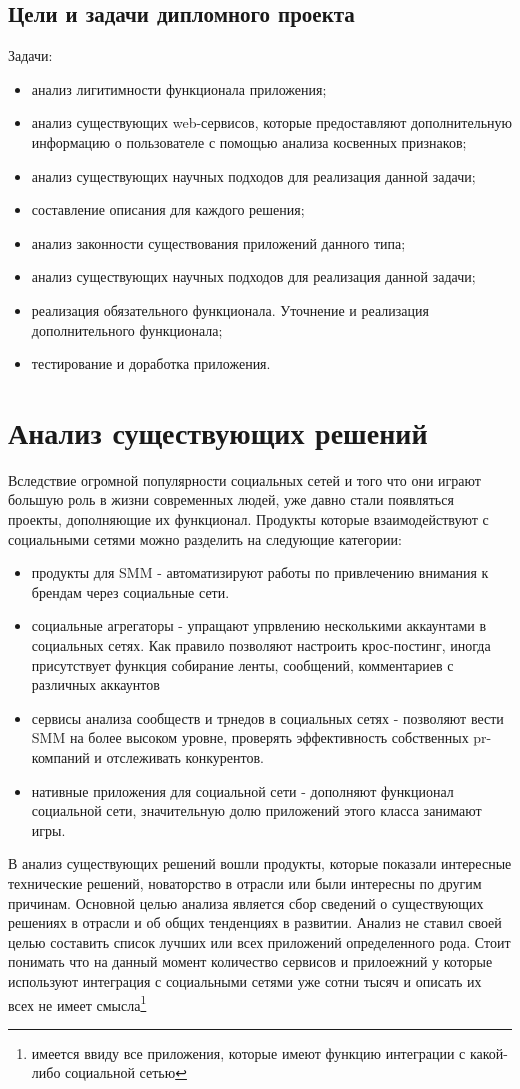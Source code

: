 \subsection{Цели и задачи дипломного проекта}
Задачи:
	\begin{itemize}
\item анализ лигитимности функционала приложения;
\item анализ существующих web-сервисов, которые предоставляют дополнительную информацию о пользователе с помощью анализа косвенных признаков;
\item анализ существующих научных подходов для реализация данной задачи;
\item составление описания для каждого решения;
\item анализ законности существования приложений данного типа;
\item анализ существующих научных подходов для реализация данной задачи;
\item реализация обязательного функционала. Уточнение и реализация дополнительного функционала;
\item тестирование и доработка приложения.
	\end{itemize}
	
\section{Анализ существующих решений}
Вследствие огромной популярности социальных сетей и того что они играют большую роль в жизни современных людей, уже давно стали появляться проекты, дополняющие их функционал. Продукты которые взаимодействуют с социальными сетями можно разделить на следующие категории:
\begin{itemize}
\item продукты для SMM - автоматизируют работы по привлечению внимания к брендам через социальные сети.
\item социальные агрегаторы - упращают упрвлению несколькими аккаунтами в социальных сетях. Как правило позволяют настроить крос-постинг, иногда присутствует функция собирание ленты, сообщений, комментариев с различных аккаунтов
\item сервисы анализа сообществ и трнедов в социальных сетях - позволяют вести SMM на более высоком уровне, проверять эффективность собственных pr-компаний и отслеживать конкурентов.
\item нативные приложения для социальной сети - дополняют функционал социальной сети, значительную долю приложений этого класса занимают игры.
\end{itemize} 
В анализ существующих решений вошли продукты, которые показали интересные технические решений, новаторство в отрасли или были интересны по другим причинам. Основной целью анализа  является сбор сведений о существующих решениях в отрасли и об общих тенденциях в развитии.  Анализ не ставил своей целью составить список лучших или всех приложений определенного рода. Стоит понимать что на данный момент количество сервисов и прилоежний у которые используют интеграция с социальными сетями уже сотни тысяч и описать их всех не имеет смысла\footnote{имеется ввиду все приложения, которые имеют функцию интеграции с какой-либо социальной сетью}
